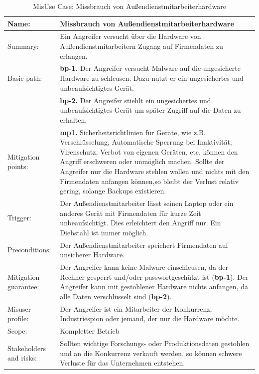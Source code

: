 \begin{table}[h]
\scriptsize
\centering
\caption{MisUse Case: Missbrauch von Außendienstmitarbeiterhardware}
\label{tab:MisuseCaseTemplate}
\begin{tabular}{p{}p{}}
\hline 
Name: & Missbrauch von Außendienstmitarbeiterhardware \\ 
\hline 
Summary: & Ein Angreifer versucht über die Hardware von Außendienstmitarbeitern Zugang auf Firmendaten zu erlangen.\\
\hline
Basic path: & \textbf{bp-1.} Der Angreifer versucht Malware auf die ungesicherte Hardware zu schleusen. Dazu nutzt er ein ungesichertes und unbeaufsichtigtes Gerät.\\
 & \textbf{bp-2.} Der Angreifer stiehlt ein ungesichertes und unbeaufsichtigtes Gerät um später Zugriff auf die Daten zu erhalten.\\ 
\hline 
Mitigation points: & \textbf{mp1.} Sicherheitsrichtlinien für Geräte, wie z.B. Verschlüsselung, Automatische Sperrung bei Inaktivität, Virenschutz, Verbot von eigenen Geräten, etc. können den Angriff erschweren oder unmöglich machen. Sollte der Angreifer nur die Hardware stehlen wollen und nichts mit den Firmendaten anfangen können,so bleibt der Verlust relativ gering, solange Backups existieren.\\ 
\hline 
Trigger: & Der Außendienstmitarbeiter lässt seinen Laptop oder ein anderes Gerät mit Firmendaten für kurze Zeit unbeaufsichtigt. Dies erleichtert den Angriff nur. Ein Diebstahl ist immer möglich.\\ 
\hline 
Preconditions: & Der Außendienstmitarbeiter speichert Firmendaten auf unsicherer Hardware.\\ 
\hline 
Mitigation guarantee: & Der Angreifer kann keine Malware einschleusen, da der Rechner gesperrt und/oder passwortgeschützt ist (\textbf{bp-1}). Der Angreifer kann mit gestohlener Hardware nichts anfangen, da alle Daten verschlüsselt sind (\textbf{bp-2}).\\ 
\hline 
Misuser profile: & Der Angreifer ist ein Mitarbeiter der Konkurrenz, Industriespion oder jemand, der nur die Hardware möchte. \\ 
\hline 
Scope: & Kompletter Betrieb \\ 
\hline 
Stakeholders and risks: & Sollten wichtige Forschungs- oder Produktionsdaten gestohlen und an die Konkurrenz verkauft werden, so können schwere Verluste für das Unternehmen entstehen. \\ 
\hline 
\end{tabular} 
\end{table}

